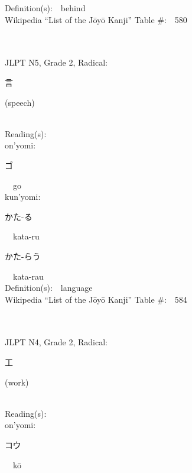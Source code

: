 \begin{multicols}{2}
Definition(s):\ \ behind \\
Wikipedia ``List of the J\=oy\=o Kanji'' Table \#:\ \ 580 \\
\ \ \\
{\fontsize{34pt}{40pt}  }\ \ \\  %
{JLPT N5, Grade 2, Radical:\ \ {\begin{CJK}{UTF8}{min} 言 \end{CJK}} (speech) } \\
Reading(s):\ \ \\
{\hspace*{1em}}on'yomi:\ \ \\
{\hspace*{2em}}{\begin{CJK}{UTF8}{min} ゴ \end{CJK}}\ \ go\ \ \\
{\hspace*{1em}}kun'yomi:\ \ \\
{\hspace*{2em}}{\begin{CJK}{UTF8}{min} かた-る \end{CJK}}\ \ kata-ru\ \ \\
{\hspace*{2em}}{\begin{CJK}{UTF8}{min} かた-らう \end{CJK}}\ \ kata-rau\ \ \\
Definition(s):\ \ language \\
Wikipedia ``List of the J\=oy\=o Kanji'' Table \#:\ \ 584 \\
\ \ \\
{\fontsize{34pt}{40pt}  }\ \ \\  %
{JLPT N4, Grade 2, Radical:\ \ {\begin{CJK}{UTF8}{min} 工 \end{CJK}} (work) } \\
Reading(s):\ \ \\
{\hspace*{1em}}on'yomi:\ \ \\
{\hspace*{2em}}{\begin{CJK}{UTF8}{min} コウ \end{CJK}}\ \ k\=o\ \ \\

\end{multicols}
